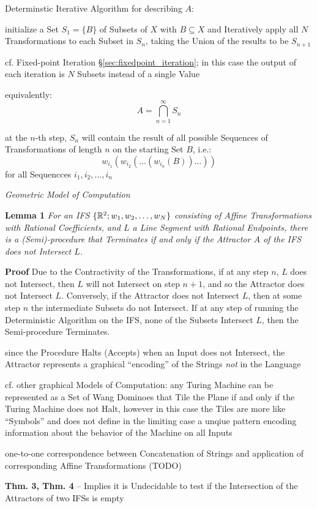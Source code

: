 Determinstic Iterative Algorithm for describing $A$:

initialize a Set $S_1 = \{ B \}$ of Subsets of $X$ with $B \subseteq X$ and
Iteratively apply all $N$ Transformations to each Subset in $S_n$, taking the
Union of the results to be $S_{n+1}$

cf. Fixed-point Iteration \S\ref{sec:fixedpoint_iteration}; in this case the
output of each iteration is $N$ Subsets instead of a single Value

equivalently:
\[
  A = \bigcap_{n=1}^{\infty} S_n
\]

at the $n$-th step, $S_n$ will contain the result of all possible Sequences of
Transformations of length $n$ on the starting Set $B$, i.e.:
\[
  w_{i_1}(w_{i_2}(\ldots(w_{i_n}(B))\ldots))
\]
for all Sequencces $i_1, i_2, \ldots, i_n$

\emph{Geometric Model of Computation}

\textbf{Lemma 1} \emph{
 For an IFS $\{\mathbb{R}^2; w_1, w_2, \ldots, w_N\}$ consisting of Affine
 Transformations with Rational Coefficients, and $L$ a Line Segment with
 Rational Endpoints, there is a (Semi)-procedure that Terminates if and only if
 the Attractor $A$ of the IFS does not Intersect $L$.
}

\textbf{Proof} Due to the Contractivity of the Transformations, if at any step
$n$, $L$ does not Intersect, then $L$ will not Intersect on step $n+1$, and so
the Attractor does not Intersect $L$. Conversely, if the Attractor does not
Intersect $L$, then at some step $n$ the intermediate Subsets do not Intersect.
If at any step of running the Deterministic Algorithm on the IFS, none of the
Subsets Intersect $L$, then the Semi-procedure Terminates.

since the Procedure Halts (Accepts) when an Input does not Intersect, the
Attractor represents a graphical ``encoding'' of the Strings \emph{not} in the
Language

cf. other graphical Models of Computation: any Turing Machine can be represented
as a Set of Wang Dominoes that Tile the Plane if and only if the Turing Machine
does not Halt, however in this case the Tiles are more like ``Symbols'' and does
not define in the limiting case a unqiue pattern encoding information about the
behavior of the Machine on all Inputs

one-to-one correspondence between Concatenation of Strings and application of
corresponding Affine Transformations (TODO)

\textbf{Thm. 3, Thm. 4} -- Implies it is Undecidable to test if the Intersection
of the Attractors of two IFSs is empty

